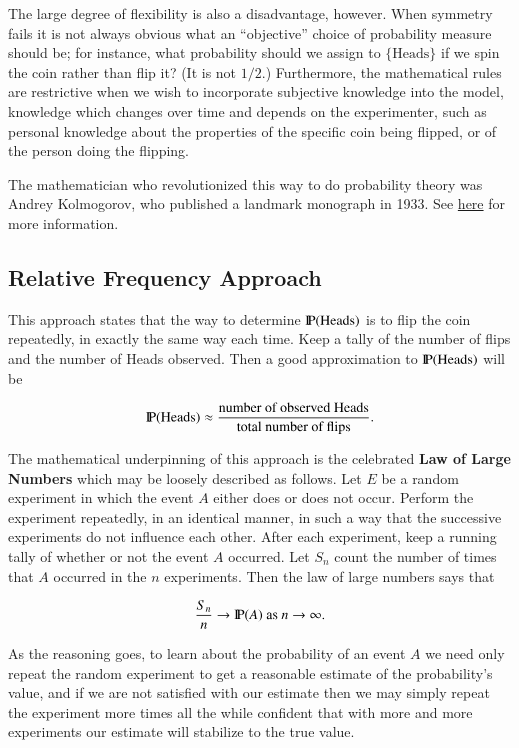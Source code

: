\documentclass[captions=tableheading]{scrbook}
\begin{document}
The large degree of flexibility is also a disadvantage, however. When symmetry fails it is not always obvious what an ``objective'' choice of probability measure should be; for instance, what probability should we assign to \( \{ \mbox{Heads} \} \) if we spin the coin rather than flip it? (It is not \(1/2\).) Furthermore, the mathematical rules are restrictive when we wish to incorporate subjective knowledge into the model, knowledge which changes over time and depends on the experimenter, such as personal knowledge about the properties of the specific coin being flipped, or of the person doing the flipping.

The mathematician who revolutionized this way to do probability theory was Andrey Kolmogorov, who published a landmark monograph in 1933. See \href{http://www-history.mcs.st-andrews.ac.uk/Mathematicians/Kolmogorov.html}{here} for more information.
\subsection{Relative Frequency Approach}
\label{sec-3-3-2}


This approach states that the way to determine \(\P(\mbox{Heads})\) is to flip the coin repeatedly, in exactly the same way each time. Keep a tally of the number of flips and the number of Heads observed. Then a good approximation to \(\P(\mbox{Heads})\) will be

\begin{equation} 
\P(\mbox{Heads})\approx\frac{\mbox{number of observed Heads}}{\mbox{total number of flips}}.
\end{equation}


The mathematical underpinning of this approach is the celebrated \textbf{Law of Large Numbers} which may be loosely described as follows. Let \(E\) be a random experiment in which the event \(A\) either does or does not occur. Perform the experiment repeatedly, in an identical manner, in such a way that the successive experiments do not influence each other. After each experiment, keep a running tally of whether or not the event \(A\) occurred. Let \(S_{n}\) count the number of times that \(A\) occurred in the \(n\) experiments. Then the law of large numbers says that 

\begin{equation}
\frac{S_{n}}{n}\to\P(A)\mbox{ as }n\to\infty.
\end{equation}


As the reasoning goes, to learn about the probability of an event \(A\) we need only repeat the random experiment to get a reasonable estimate of the probability's value, and if we are not satisfied with our estimate then we may simply repeat the experiment more times all the while confident that with more and more experiments our estimate will stabilize to the true value. 
\end{document}
